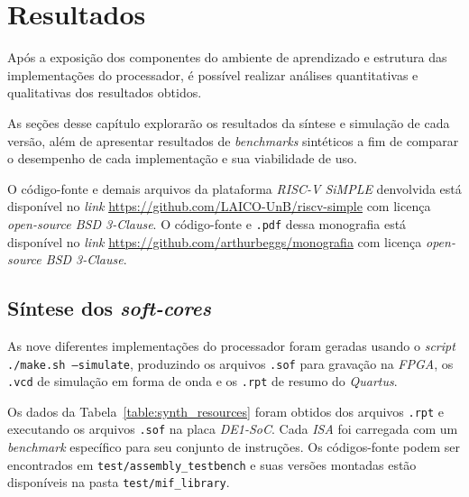 \chapter{Resultados}\label{cap4_resultados}

{ Após a exposição dos componentes do ambiente de aprendizado e estrutura das
    implementações do processador, é possível realizar análises quantitativas
    e qualitativas dos resultados obtidos.
}

{ As seções desse capítulo explorarão os resultados da síntese e simulação de
    cada versão, além de apresentar resultados de \textit{benchmarks} sintéticos
    a fim de comparar o desempenho de cada implementação e sua viabilidade de uso.
}

{ O código-fonte e demais arquivos da plataforma \textit{RISC-V SiMPLE} denvolvida
    está disponível no \textit{link} \url{https://github.com/LAICO-UnB/riscv-simple}
    com licença \textit{open-source BSD 3-Clause}. O código-fonte e \texttt{.pdf}
    dessa monografia está disponível no \textit{link} \url{https://github.com/arthurbeggs/monografia}
    com licença \textit{open-source BSD 3-Clause}.
}

\section{Síntese dos \textit{soft-cores}}
    { As nove diferentes implementações do processador foram geradas usando o \textit{script}
        \texttt{./make.sh --simulate}, produzindo os arquivos \texttt{.sof} para
        gravação na \textit{FPGA}, os \texttt{.vcd} de simulação em forma de onda
        e os \texttt{.rpt} de resumo do \textit{Quartus}.
    }

    { Os dados da Tabela~\ref{table:synth_resources} foram obtidos dos arquivos
        \texttt{.rpt} e executando os arquivos \texttt{.sof} na placa \textit{DE1-SoC}.
        Cada \textit{ISA} foi carregada com um \textit{benchmark} específico para seu
        conjunto de instruções. Os códigos-fonte podem ser encontrados em
        \texttt{test/assembly\_testbench} e suas versões montadas estão disponíveis
        na pasta \texttt{test/mif\_library}.
    }

